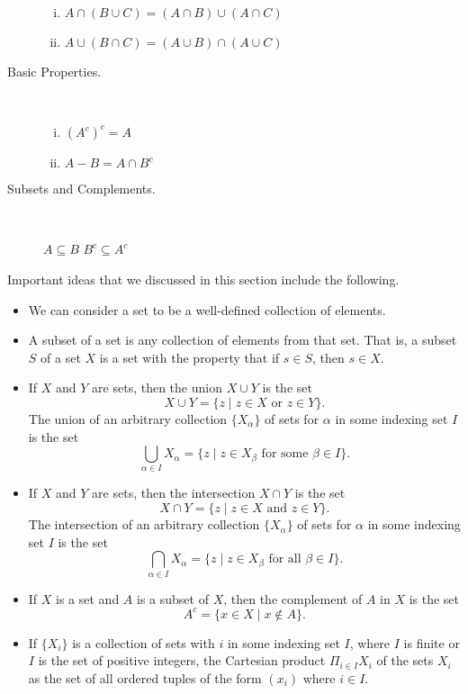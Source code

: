 \begin{theorem}
\begin{multicols}{2}
\begin{description}
	\begin{enumerate}[i.]
	\item $A \cap (B \cup C) = (A \cap B) \cup (A \cap C)$ 
	\item$A \cup (B \cap C) = (A \cup B) \cap (A \cup C)$ 
	\end{enumerate}
\item[Basic Properties.] ~
	\begin{enumerate}[i.]
	\item $\left(A^c\right)^c = A$ 
	\item $A - B = A \cap B^c$ 
	\end{enumerate}
\item[Subsets and Complements.] ~

$A \subseteq B$  $B^c \subseteq A^c$
\end{description}
\end{multicols}
\end{theorem}

\label{sec_sets_summ}
Important ideas that we discussed in this section include the following.
\begin{itemize}
\item We can consider a set to be a well-defined collection of elements.
\item A subset of a set is any collection of elements from that set. That is, a subset $S$ of a set $X$ is a set with the property that if $s \in S$, then $s \in X$. 
\item If $X$ and $Y$ are sets, then the union $X \cup Y$ is the set 
\[X \cup Y = \{z \mid z \in X \text{ or } z \in Y\}.\]
The union of an arbitrary collection $\{X_{\alpha}\}$ of sets for $\alpha$ in some indexing set $I$ is the set 
\[\bigcup_{\alpha \in I} X_{\alpha} = \{z \mid z \in X_{\beta} \text{ for some } \beta \in I\}.\]
\item If $X$ and $Y$ are sets, then the intersection $X \cap Y$ is the set 
\[X \cap Y = \{z \mid z \in X \text{ and } z \in Y\}.\]
The intersection of an arbitrary collection $\{X_{\alpha}\}$ of sets for $\alpha$ in some indexing set $I$ is the set 
\[\bigcap_{\alpha \in I} X_{\alpha} = \{z \mid z \in X_{\beta} \text{ for all } \beta \in I\}.\]
\item If $X$ is a set and $A$ is a subset of $X$, then the complement of $A$ in $X$ is the set 
\[A^c = \{x \in X \mid x \notin A\}.\]
\item If $\{X_{i}\}$ is a collection of sets with $i$ in some indexing set $I$, where $I$ is finite or $I$ is the set of positive integers, the Cartesian product $\Pi_{i \in I} X_i$ of the sets $X_{i}$ as the set of all ordered tuples of the form $(x_i)$ where $i \in I$. 
\end{itemize}

